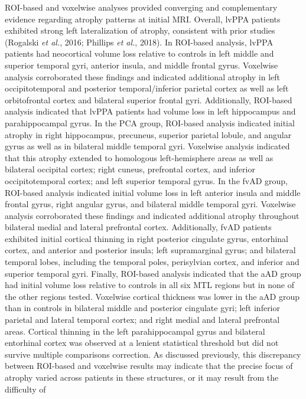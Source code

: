 \documentclass[]{article}
\begin{document}
ROI-based and voxelwise analyses provided converging and complementary
evidence regarding atrophy patterns at initial MRI. Overall, lvPPA
patients exhibited strong left lateralization of atrophy, consistent
with prior studies (Rogalski \emph{et al.}, 2016; Phillips \emph{et
al.}, 2018). In ROI-based analysis, lvPPA patients had neocortical
volume loss relative to controls in left middle and superior temporal
gyri, anterior insula, and middle frontal gyrus. Voxelwise analysis
corroborated these findings and indicated additional atrophy in left
occipitotemporal and posterior temporal/inferior parietal cortex as well
as left orbitofrontal cortex and bilateral superior frontal gyri.
Additionally, ROI-based analysis indicated that lvPPA patients had
volume loss in left hippocampus and parahippocampal gyrus. In the PCA
group, ROI-based analysis indicated initial atrophy in right
hippocampus, precuneus, superior parietal lobule, and angular gyrus as
well as in bilateral middle temporal gyri. Voxelwise analysis indicated
that this atrophy extended to homologous left-hemisphere areas as well
as bilateral occipital cortex; right cuneus, prefrontal cortex, and
inferior occipitotemporal cortex; and left superior temporal gyrus. In
the fvAD group, ROI-based analysis indicated initial volume loss in left
anterior insula and middle frontal gyrus, right angular gyrus, and
bilateral middle temporal gyri. Voxelwise analysis corroborated these
findings and indicated additional atrophy throughout bilateral medial
and lateral prefrontal cortex. Additionally, fvAD patients exhibited
initial cortical thinning in right posterior cingulate gyrus, entorhinal
cortex, and anterior and posterior insula; left supramarginal gyrus; and
bilateral temporal lobes, including the temporal poles, perisylvian
cortex, and inferior and superior temporal gyri. Finally, ROI-based
analysis indicated that the aAD group had initial volume loss relative
to controls in all six MTL regions but in none of the other regions
tested. Voxelwise cortical thickness was lower in the aAD group than in
controls in bilateral middle and posterior cingulate gyri; left inferior
parietal and lateral temporal cortex; and right medial and lateral
prefrontal areas. Cortical thinning in the left parahippocampal gyrus
and bilateral entorhinal cortex was observed at a lenient statistical
threshold but did not survive multiple comparisons correction. As
discussed previously, this discrepancy between ROI-based and voxelwise
results may indicate that the precise focus of atrophy varied across
patients in these structures, or it may result from the difficulty of
\end{document}
